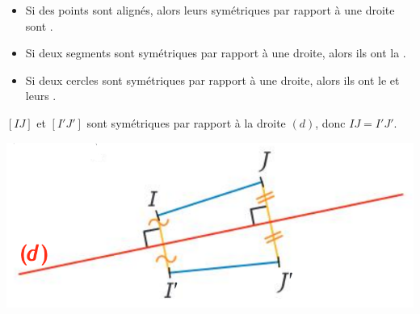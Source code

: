 \documentclass[xcolor={dvipsnames}]{beamer}
\begin{document}
\begin{frame}
	\begin{myprops}
		\begin{itemize}
			\item Si des points sont alignés, alors leurs symétriques par rapport à une droite sont .
			\item Si deux segments sont symétriques par rapport à une droite, alors ils ont la .
			\item Si deux cercles sont symétriques par rapport à une droite, alors ils ont le  et leurs .
		\end{itemize}
		
	\end{myprops}
	
	\begin{myexs}
		$[IJ]$ et $[I'J']$ sont symétriques par rapport à la droite $(d)$, donc $IJ = I'J'$.
	
		\begin{center}
			\includegraphics[scale=0.3]{prop2}
		\end{center}
	\end{myexs}
\end{frame}
\end{document}
